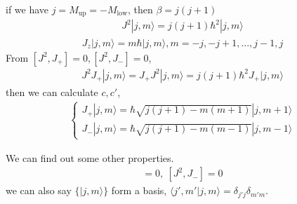 \documentclass[UTF8,12pt]{article} %
\begin{document}
if we have $j = M_{\text{up}} = -M_{\text{low}}$, then $\boxed{\beta = j(j+1)}$
\begin{align}
\boxed{J^{2}|j,m\rangle = j(j+1)\hbar^{2}|j,m\rangle}
\end{align}
\begin{align}
\boxed{J_{z}|j,m\rangle = m\hbar|j,m\rangle, m = -j, -j+1, ..., j-1, j}
\end{align}
From $[J^{2}, J_{+}] = 0, [J^{2}, J_{-}] = 0$,
\begin{align}
J^{2}J_{+}|j,m\rangle = J_{+}J^{2}|j,m\rangle = j(j+1)\hbar^{2}J_{+}|j,m\rangle
\end{align}
then we can calculate $c, c'$,
\begin{align}
\boxed{\begin{cases}
J_{+}|j,m\rangle = \hbar\sqrt{j(j+1) - m(m+1)}|j,m+1\rangle \\
J_{-}|j,m\rangle = \hbar\sqrt{j(j+1) - m(m-1)}|j,m-1\rangle
\end{cases}}
\end{align}

We can find out some other properties.
\begin{align}
[J^{2}, J_{+}] = 0,~ [J^{2}, J_{-}] = 0
\end{align}
we can also say $\{|j,m\rangle\}$ form a basis, $\langle j',m'|j,m\rangle = \delta_{j'j}\delta_{m'm}$.
\end{document}
